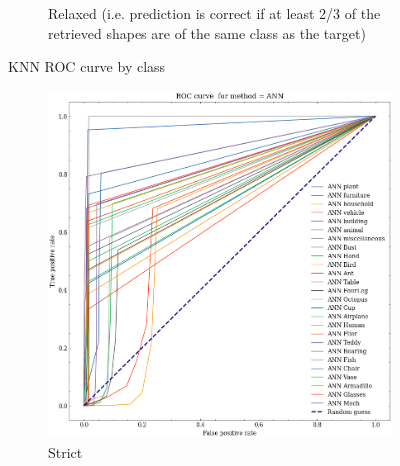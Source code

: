 \begin{figure}
\begin{subfigure}[b]{0.45\textwidth}
            \caption{Relaxed (i.e. prediction is correct if at least 2/3 of the retrieved shapes are of the same class as the target)}
        \end{subfigure}
    \caption{KNN ROC curve by class}
    \label{fig:knn-roc-curve-results}
\end{figure}

\begin{figure}
    \centering
    \begin{subfigure}[b]{0.45\textwidth}
            \includegraphics[width=\textwidth]{assets/evaluation_results/ANN/roc_curve_ANN_strict.png}
            \caption{Strict}
    \end{subfigure}
    \hfill
    \begin{subfigure}[b]{0.45\textwidth}

\end{subfigure}
\end{figure}

